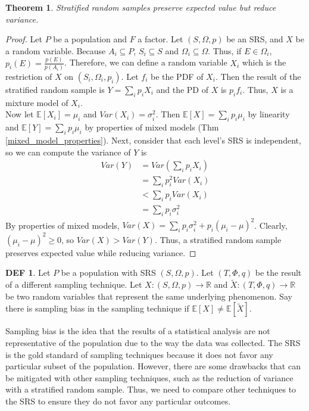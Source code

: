 \documentclass{article}
\newtheorem{theorem}{Theorem}
\theoremstyle{definition}\newtheorem{definition}{DEF}
\theoremstyle{definition}\newtheorem{example}{Ex}
\theoremstyle{lemma}\newtheorem{lemma}{Lemma}
\theoremstyle{corrolary}\newtheorem{corrolary}{Cor}
\begin{document}
\begin{theorem}
Stratified random samples preserve expected value but reduce variance.
\end{theorem}
\begin{proof}
Let $P$ be a population and $F$ a factor.
Let $(S, \Omega, p)$ be an SRS, and $X$ be a random variable.
Because $A_i \subseteq P$, $S_i \subseteq S$ and $\Omega_i \subseteq \Omega$.
Thus, if $E \in \Omega_i$, $p_i(E)=\frac{p(E)}{p(A_i)}$.
Therefore, we can define a random variable $X_i$ which is the restriction of $X$ on $(S_i, \Omega_i, p_i)$.
Let $f_i$ be the PDF of $X_i$.
Then the result of the stratified random sample is $Y=\sum_i p_i X_i$ and the PD of $X$ is $p_i f_i$.
Thus, $X$ is a mixture model of $X_i$. \\
Now let $\mathbb{E}[X_i]=\mu_i$ and $Var(X_i)=\sigma_i^2$.
Then $\mathbb{E}[X] =\sum_i p_i \mu_i$ by linearity and $\mathbb{E}[Y]=\sum_i p_i \mu_i$ by properties of mixed models (Thm \ref{mixed_model_properties}).
Next, consider that each level's SRS is independent, so we can compute the variance of $Y$ is
\begin{align*}
Var(Y)
&= Var(\sum_i p_i X_i) \\
&= \sum_i p_i^2 Var(X_i) \\
&< \sum_i p_i Var(X_i) \\
&= \sum_i p_i \sigma_i^2
\end{align*}
By properties of mixed models, $Var(X)=\sum_i p_i \sigma_i^2 + p_i (\mu_i - \mu)^2$.
Clearly, $(\mu_i - \mu)^2\geq 0$, so $Var(X)>Var(Y)$.
Thus, a stratified random sample preserves expected value while reducing variance.
\end{proof}

\begin{definition}
Let $P$ be a population with SRS $(S, \Omega, p)$.
Let $(T, \Phi, q)$ be the result of a different sampling technique.
Let $X: (S, \Omega, p) \rightarrow \mathbb{R}$ and $\tilde{X}: (T, \Phi, q) \rightarrow \mathbb{R}$ be two random variables that represent the same underlying phenomenon.
Say there is sampling bias in the sampling technique if $\mathbb{E}[X] \neq \mathbb{E}[\tilde{X}]$.
\end{definition}

Sampling bias is the idea that the results of a statistical analysis are not representative of the population due to the way the data was collected.
The SRS is the gold standard of sampling techniques because it does not favor any particular subset of the population.
However, there are some drawbacks that can be mitigated with other sampling techniques, such as the reduction of variance with a stratified random sample.
Thus, we need to compare other techniques to the SRS to ensure they do not favor any particular outcomes.
\end{document}
